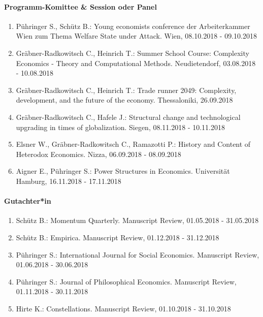 \paragraph{Programm-Komittee \& Session oder Panel}
\begin{enumerate}[leftmargin=*, labelsep=0.5cm]
\item Pühringer S., Schütz B.: Young economists conference der Arbeiterkammer Wien zum Thema \glqq Welfare State under Attack\grqq{}. Wien, 08.10.2018 - 09.10.2018
\item Gräbner-Radkowitsch C., Heinrich T.: Summer School Course: Complexity Economics - Theory and Computational Methods. Neudietendorf, 03.08.2018 - 10.08.2018
\item Gräbner-Radkowitsch C., Heinrich T.: Trade runner 2049: Complexity, development, and the future of the economy. Thessaloniki, 26.09.2018
\item Gräbner-Radkowitsch C., Hafele J.: Structural change and technological upgrading in times of globalization. Siegen, 08.11.2018 - 10.11.2018
\item Elsner W., Gräbner-Radkowitsch C., Ramazotti P.: History and Content of Heterodox Economics. Nizza, 06.09.2018 - 08.09.2018
\item Aigner E., Pühringer S.: Power Structures in Economics. Universität Hamburg, 16.11.2018 - 17.11.2018
\end{enumerate}

\paragraph{Gutachter*in}
\begin{enumerate}[leftmargin=*, labelsep=0.5cm]
\item Schütz B.: Momentum Quarterly. Manuscript Review, 01.05.2018 - 31.05.2018
\item Schütz B.: Empirica. Manuscript Review, 01.12.2018 - 31.12.2018
\item Pühringer S.: International Journal for Social Economics. Manuscript Review, 01.06.2018 - 30.06.2018
\item Pühringer S.: Journal of Philosophical Economics. Manuscript Review, 01.11.2018 - 30.11.2018
\item Hirte K.: Constellations. Manuscript Review, 01.10.2018 - 31.10.2018
\end{enumerate}

